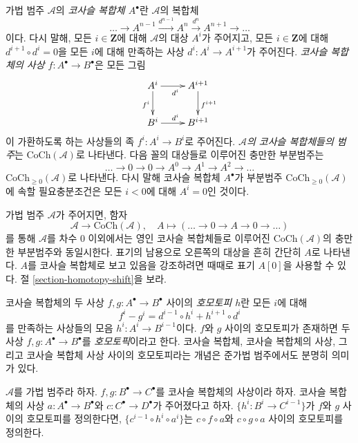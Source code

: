 \noindent
가법 범주 $\mathcal{A}$의 {\it 코사슬 복합체 $A^\bullet$}란
$\mathcal{A}$의 복합체
$$
\ldots \to
A^{n - 1} \xrightarrow{d^{n - 1}}
A^n \xrightarrow{d^n}
A^{n + 1} \to
\ldots
$$
이다. 다시 말해, 모든 $i \in \mathbf{Z}$에 대해 $\mathcal{A}$의
대상 $A^i$가 주어지고, 모든 $i \in \mathbf{Z}$에 대해
$d^{i + 1} \circ d^i = 0$을 모든 $i$에 대해 만족하는 사상
$d^i : A^i \to A^{i + 1}$가 주어진다.
{\it 코사슬 복합체의 사상 $f : A^\bullet \to B^\bullet$}은 모든 그림
$$
\xymatrix{
A^i \ar[r]_{d^i} \ar[d]_{f^i} & A^{i + 1} \ar[d]^{f^{i + 1}} \\
B^i \ar[r]^{d^i} & B^{i + 1}
}
$$
이 가환하도록 하는 사상들의 족 $f^i : A^i \to B^i$로 주어진다.
{\it $\mathcal{A}$의 코사슬 복합체들의 범주}는
$\text{CoCh}(\mathcal{A})$로 나타낸다. 다음 꼴의 대상들로 이루어진
충만한 부분범주는
$$
\ldots \to 0 \to 0 \to A^0 \to A^1 \to A^2 \to \ldots
$$
$\text{CoCh}_{\geq 0}(\mathcal{A})$로 나타낸다.
다시 말해 코사슬 복합체 $A^\bullet$가 부분범주
$\text{CoCh}_{\geq 0}(\mathcal{A})$에 속할 필요충분조건은 모든
$i < 0$에 대해 $A^i = 0$인 것이다.

\medskip\noindent
가법 범주 $\mathcal{A}$가 주어지면, 함자
$$
\mathcal{A} \longrightarrow \text{CoCh}(\mathcal{A}),\quad
A \longmapsto (\ldots \to 0 \to A \to 0 \to \ldots)
$$
를 통해 $\mathcal{A}$를 차수 $0$ 이외에서는 영인 코사슬 복합체들로
이루어진 $\text{CoCh}(\mathcal{A})$의 충만한 부분범주와 동일시한다.
표기의 남용으로 오른쪽의 대상을 흔히 간단히 $A$로 나타낸다.
$A$를 코사슬 복합체로 보고 있음을 강조하려면 때때로 표기 $A[0]$을
사용할 수 있다. 절 \ref{section-homotopy-shift}을 보라.

\medskip\noindent
코사슬 복합체의 두 사상 $f, g : A^\bullet \to B^\bullet$ 사이의
{\it 호모토피 $h$}란 모든 $i$에 대해
$$
f^i - g^i = d^{i - 1} \circ h^i + h^{i + 1} \circ d^i
$$
를 만족하는 사상들의 모음 $h^i : A^i \to B^{i - 1}$이다.
$f$와 $g$ 사이의 호모토피가 존재하면 두 사상
$f, g : A^\bullet \to B^\bullet$를 {\it 호모토픽}이라고 한다.
코사슬 복합체, 코사슬 복합체의 사상, 그리고 코사슬 복합체 사상 사이의
호모토피라는 개념은 준가법 범주에서도 분명히 의미가 있다.

\begin{lemma}
\label{lemma-compose-homotopy-cochain}
$\mathcal{A}$를 가법 범주라 하자.
$f, g : B^\bullet \to C^\bullet$를 코사슬 복합체의 사상이라 하자.
코사슬 복합체의 사상 $a : A^\bullet \to B^\bullet$와
$c : C^\bullet \to D^\bullet$가 주어졌다고 하자.
$\{h^i : B^i \to C^{i - 1}\}$가 $f$와 $g$ 사이의 호모토피를
정의한다면, $\{c^{i - 1} \circ h^i \circ a^i\}$는
$c \circ f \circ a$와 $c \circ g \circ a$ 사이의 호모토피를
정의한다.
\end{lemma}

